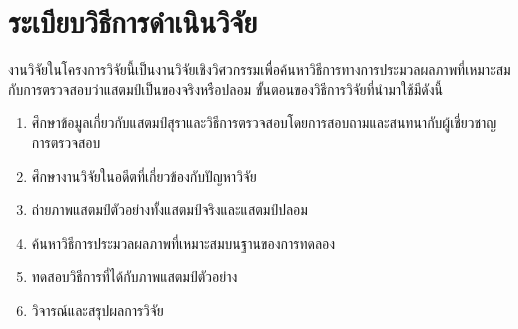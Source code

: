 \section{ระเบียบวิธีการดำเนินวิจัย}
งานวิจัยในโครงการวิจัยนี้เป็นงานวิจัยเชิงวิศวกรรมเพื่อค้นหาวิธีการทางการประมวลผลภาพที่เหมาะสมกับการตรวจสอบว่าแสตมป์เป็นของจริงหรือปลอม ขั้นตอนของวิธีการวิจัยที่นำมาใช้มีดังนี้
\begin{enumerate}
\item ศึกษาข้อมูลเกี่ยวกับแสตมป์สุราและวิธีการตรวจสอบโดยการสอบถามและสนทนากับผู้เชี่ยวชาญการตรวจสอบ
\item ศึกษางานวิจัยในอดีตที่เกี่ยวข้องกับปัญหาวิจัย
\item ถ่ายภาพแสตมป์ตัวอย่างทั้งแสตมป์จริงและแสตมป์ปลอม
\item ค้นหาวิธีการประมวลผลภาพที่เหมาะสมบนฐานของการทดลอง
\item ทดสอบวิธีการที่ได้กับภาพแสตมป์ตัวอย่าง
\item วิจารณ์และสรุปผลการวิจัย

\end{enumerate}
